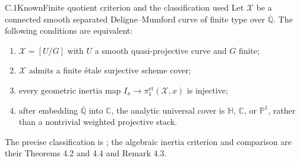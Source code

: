 \begin{statement}{C.1}{Known}{Finite quotient criterion and the classification used}
Let $\mathcal X$ be a connected smooth separated Deligne--Mumford curve
of finite type over $\overline{\mathbb Q}$. The following conditions
are equivalent:
\begin{enumerate}
\item $\mathcal X=[U/G]$ with $U$ a smooth quasi-projective curve and
      $G$ finite;
\item $\mathcal X$ admits a finite \'etale surjective scheme cover;
\item every geometric inertia map
      $I_x\to\pi_1^{\mathrm{et}}(\mathcal X,x)$ is injective;
\item after embedding $\overline{\mathbb Q}$ into $\mathbb C$, the
      analytic universal cover is $\mathbb H$, $\mathbb C$, or
      $\mathbb P^1$, rather than a nontrivial weighted projective stack.
\end{enumerate}
The precise classification is
\citet[Theorem 1.1, Proposition 7.2, Corollary 7.7]{BehrendNoohi2006};
the algebraic inertia criterion and comparison are their Theorems 4.2
and 4.4 and Remark 4.3.
\end{statement}
